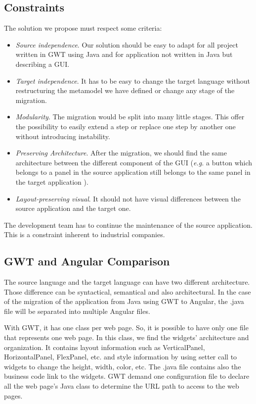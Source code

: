 \documentclass[conference]{IEEEtran}
\begin{document}
\subsection{Constraints}

The solution we propose must respect some criteria:
\begin{itemize}
    \item \emph{Source independence}. Our solution should be easy to adapt
        for all project written in GWT using Java and for
        application not written in Java but describing a GUI.
    \item \emph{Target independence}. It has to be easy to change the target
        language without restructuring the metamodel we have defined or 
        change any stage of the migration.
    \item \emph{Modularity}. The migration would be split into many little
        stages. This offer the possibility to easily extend a step or 
        replace one step by another one without introducing instability. 
    \item \emph{Preserving Architecture}. After the migration, we should find
        the same architecture between the different component of the GUI (\emph{e.g.}
        a button which belongs to a panel in the source application still belongs to the same panel in the target application ).
    \item \emph{Layout-preserving visual}. It should not have visual differences
        between the source application and the target one.
\end{itemize}

The development team has to continue the maintenance of the source application.
This is a constraint inherent to industrial companies.

\subsection{GWT and Angular Comparison}
The source language and the target language can have two different architecture.
Those difference can be syntactical, semantical and also architectural. %
In the case of the migration of the application from Java using GWT to Angular, 
    the .java file will be separated into multiple Angular files.

With GWT, it has one class per web page.
So, it is possible to have only one file that represents one web page.
In this class, we find the widgets' architecture and organization.
It contains layout information such as VerticalPanel, HorizontalPanel, FlexPanel, etc.
    and style information by using setter call to widgets to change the height, width, color, etc.
The .java file contains also the business code link to the widgets.
GWT demand one configuration file to declare all the web page's Java class to
    determine the URL path to access to the web pages.
\end{document}
